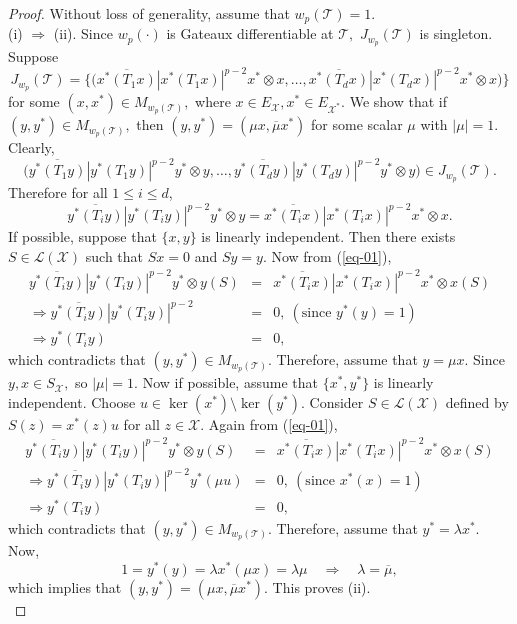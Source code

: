 \documentclass[10pt,a4paper]{amsart}
\begin{document}
\begin{proof}
	Without loss of generality, assume that $w_p(\mathcal{T})=1.$ \\
(i) $\Rightarrow $ (ii). Since $w_p(\cdot)$ is Gateaux differentiable at $\mathcal{T},$ $J_{w_p}(\mathcal{T})$ is singleton. Suppose $$J_{w_p}(\mathcal{T})=\bigg\{\bigg(\overline{x^*(T_1x)}|x^*(T_1x)|^{p-2}x^*\otimes x,\ldots,\overline{x^*(T_dx)}|x^*(T_dx)|^{p-2}x^*\otimes x\bigg)\bigg\}$$
for some $(x,x^*)\in M_{w_p(\mathcal{T})},$ where $x\in E_{\mathcal{X}}, x^*\in E_{\mathcal{X}^*}.$ We show that if
 $(y,y^*)\in M_{w_p(\mathcal{T})},$ then $(y,y^*)=(\mu x,\overline{\mu}x^*)$ for some scalar $\mu$ with $|\mu|=1.$ Clearly,
 \[\bigg(\overline{y^*(T_1y)}|y^*(T_1y)|^{p-2}y^*\otimes y,\ldots,\overline{y^*(T_dy)}|y^*(T_dy)|^{p-2}y^*\otimes y\bigg)\in J_{w_p}(\mathcal{T}).\]  
 Therefore for all $1\leq i\leq d$, 
 \begin{equation}\label{eq-01}
 \overline{y^*(T_iy)}|y^*(T_iy)|^{p-2}y^*\otimes y=\overline{x^*(T_ix)}|x^*(T_ix)|^{p-2}x^*\otimes x.
\end{equation}
 If possible, suppose that $\{x,y\}$ is linearly independent. Then there exists $S\in \mathcal{L}(\mathcal{X})$ such that $Sx=0$ and $Sy=y.$ Now from (\ref{eq-01}),
 \begin{eqnarray*}
 	 \overline{y^*(T_iy)}|y^*(T_iy)|^{p-2}y^*\otimes y(S)&=&\overline{x^*(T_ix)}|x^*(T_ix)|^{p-2}x^*\otimes x(S)\\
 	 \Rightarrow \overline{y^*(T_iy)}|y^*(T_iy)|^{p-2}&=&0, ~(\text{since } y^*(y)=1)\\
 	 \Rightarrow y^*(T_iy)&=&0,
 	\end{eqnarray*}
 which contradicts that $(y,y^*)\in M_{w_p(\mathcal{T})}.$ Therefore, assume that $y=\mu x.$ Since $y,x\in S_{\mathcal{X}},$ so $|\mu|=1.$ Now if possible, assume that $\{x^*,y^*\}$ is linearly independent. Choose $u\in \ker(x^*)\setminus \ker(y^*).$ Consider $S\in \mathcal{L}(\mathcal{X})$ defined by $S(z)=x^*(z)u$ for all $z\in \mathcal{X}.$ Again from (\ref{eq-01}), 
  \begin{eqnarray*}
 	\overline{y^*(T_iy)}|y^*(T_iy)|^{p-2}y^*\otimes y(S)&=&\overline{x^*(T_ix)}|x^*(T_ix)|^{p-2}x^*\otimes x(S)\\
 	\Rightarrow \overline{y^*(T_iy)}|y^*(T_iy)|^{p-2}y^*(\mu u)&=&0, ~(\text{since } x^*(x)=1)\\
 	\Rightarrow y^*(T_iy)&=&0,
 \end{eqnarray*}
 which contradicts that $(y,y^*)\in M_{w_p(\mathcal{T})}.$ Therefore, assume that $y^*=\lambda x^*.$  Now,
 \[1=y^*(y)=\lambda x^*(\mu x)=\lambda \mu\quad \Rightarrow \quad \lambda =\overline{\mu},\]
 which implies that $(y,y^*)=(\mu x,\overline{\mu}x^*).$ This proves (ii).\\
 

\end{proof}
\end{document}
